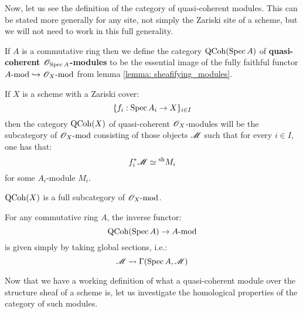             Now, let us see the definition of the category of quasi-coherent modules. This can be stated more generally for any site, not simply the Zariski site of a scheme, but we will not need to work in this full generality.
            \begin{definition} \label{def: quasi_coherent_modules}
                If $A$ is a commutative ring then we define the category $\mathrm{QCoh}(\operatorname{Spec} A)$ of \textbf{quasi-coherent $\mathscr{O}_{\operatorname{Spec} A}$-modules} to be the essential image of the fully faithful functor $A\text{-}\mathrm{mod} \hookrightarrow \mathscr{O}_X\text{-}\mathrm{mod}$ from lemma \ref{lemma: sheafifying_modules}.

                If $X$ is a scheme with a Zariski cover:
                    $$\{ f_i: \operatorname{Spec} A_i \to X \}_{i \in I}$$
                then the category $\mathrm{QCoh}(X)$ of quasi-coherent $\mathscr{O}_X$-modules will be the subcategory of $\mathscr{O}_X\text{-}\mathrm{mod}$ consisting of those objects $\mathscr{M}$ such that for every $i \in I$, one has that:
                    $$f_i^*\mathscr{M} \simeq {}^{\mathrm{sh}}M_i$$
                for some $A_i$-module $M_i$.
            \end{definition}
            \begin{remark}
                $\mathrm{QCoh}(X)$ is a full subcategory of $\mathscr{O}_X\text{-}\mathrm{mod}$.
            \end{remark}
            \begin{remark}
                For any commutative ring $A$, the inverse functor:
                    $$\mathrm{QCoh}(\operatorname{Spec} A) \to A\text{-}\mathrm{mod}$$
                is given simply by taking global sections, i.e.:
                    $$\mathscr{M} \leadsto \Gamma(\operatorname{Spec} A, \mathscr{M})$$
            \end{remark}

            Now that we have a working definition of what a quasi-coherent module over the structure sheaf of a scheme is, let us investigate the homological properties of the category of such modules. 

